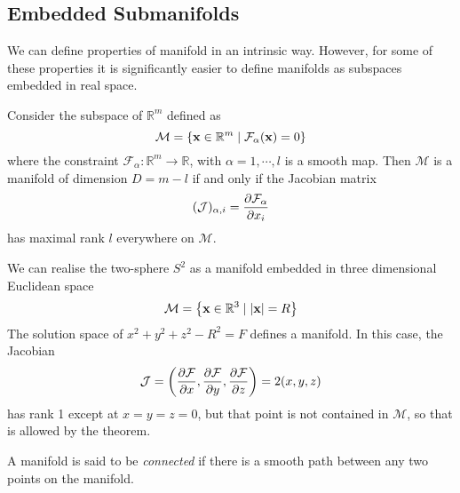
\subsection{Embedded Submanifolds}%
\label{sub:embedded submanifolds}

We can define properties of manifold in an intrinsic way. However, for some of these properties it is significantly easier to define manifolds as subspaces embedded in real space.
\begin{theorem}
  Consider the subspace of $\mathbb{R}^m$ defined as
  \begin{equation}
    \mathcal{M} = \left\{ \vb{x} \in \mathbb{R}^m \mid \mathcal{F}_\alpha(\vb{x}) = 0 \right\}
  \end{equation}
  where the constraint $\mathcal{F}_\alpha \colon \mathbb{R}^m \to \mathbb{R}$, with $\alpha = 1, \cdots, l$ is a smooth map.  Then $\mathcal{M}$ is a manifold of dimension $D = m-l$ if and only if the Jacobian matrix
  \begin{equation}
    (\mathcal{J})_{\alpha, i} = \pdv{\mathcal{F}_\alpha}{x_i}
  \end{equation}
  has maximal rank $l$ everywhere on $\mathcal{M}$.
\end{theorem}

\begin{example}[$S^2$]
We can realise the two-sphere $S^2$ as a manifold embedded in three dimensional Euclidean space
\begin{equation}
  \mathcal{M} = \left\{\vb{x} \in \mathbb{R}^3 \mid \abs{\vb{x}} = R \right\}
\end{equation}
The solution space of $x^2 + y^2 + z^2 -R^2 = F$ defines a manifold.
In this case, the Jacobian 
\begin{equation}
  \mathcal{J} = \left( \pdv{\mathcal{F}}{x}, \pdv{\mathcal{F}}{y}, \pdv{\mathcal{F}}{z}\right) = 2(x, y, z)
\end{equation}
has rank 1 except at $x = y = z = 0$, but that point is not contained in $\mathcal{M}$, so that is allowed by the theorem.
\end{example}

\begin{definition}[connected]
  A manifold is said to be \emph{connected} if there is a smooth path between any two points on the manifold.
\end{definition} 


